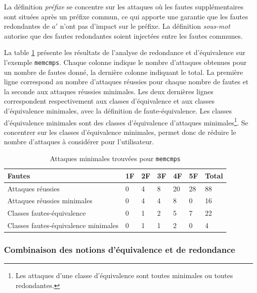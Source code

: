             La définition \textit{préfixe} se concentre sur les attaques où les fautes supplémentaires sont situées après un préfixe commun, ce qui apporte une garantie que les fautes redondantes de $a'$ n'ont pas d'impact sur le préfixe.
            La définition\textit{ sous-mot} autorise que des fautes redondantes soient injectées entre les fautes communes.
        
            La table \ref{tbl:memcmps-aar-results} présente les résultats de l'analyse de redondance et d'équivalence sur l'exemple \texttt{memcmps}. 
            Chaque colonne indique le nombre d'attaques obtenues pour un nombre de fautes donné, la dernière colonne indiquant le total.
            La première ligne correspond au nombre d'attaques réussies pour chaque nombre de fautes et la seconde aux attaques réussies minimales.
            Les deux dernières lignes correspondent respectivement aux classes d'équivalence et aux classes d'équivalence minimales, avec la définition de faute-équivalence. Les classes d'équivalence minimales sont des classes d'équivalence d'attaques minimales\footnote{Les attaques d'une classe d'équivalence sont toutes minimales ou toutes redondantes.}.
            Se concentrer sur les classes d'équivalence minimales, permet donc de réduire le nombre d'attaques à considérer pour l'utilisateur.
            
            \begin{table}[h]
                \caption{Attaques minimales trouvées pour \texttt{memcmps}}
                \label{tbl:memcmps-aar-results}
                \small
                \begin{center}
                    \begin{tabular}{l|llllll}
                    Fautes & 1F & 2F & 3F & 4F & 5F & Total \\ 
                    \hline
                    Attaques réussies & 0 & 4 & 8 & 20 & 28 & 88 \\ 
                    Attaques réussies minimales & 0 & 4 & 4 & 8 & 0 & 16 \\ 
                    Classes fautes-équivalence & 0 & 1 & 2 & 5 & 7 & 22 \\ 
                    Classes fautes-équivalence minimales & 0 & 1 & 1 & 2 & 0 & 4
                    \end{tabular}
                \end{center}
            \end{table}  
            
            \subsubsection{Combinaison des notions d'équivalence et de redondance}
            
